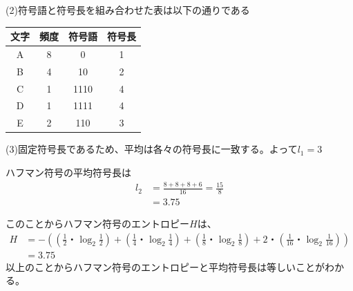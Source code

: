 \documentclass[a4paper,11pt]{ltjsarticle}
\begin{document}
(2)符号語と符号長を組み合わせた表は以下の通りである

\begin{table}[h]
  \centering
  \begin{tabular}{|c|c|c|c|} \hline
  文字 & 頻度 & 符号語 & 符号長 \\ \hline \hline
  A & 8 & 0 & 1 \\ \hline
  B & 4 & 10 & 2 \\ \hline
  C & 1 & 1110 & 4 \\ \hline
  D & 1 & 1111 & 4 \\ \hline
  E & 2 & 110 & 3 \\ \hline
  \end{tabular}
\end{table}

(3)固定符号長であるため、平均は各々の符号長に一致する。よって$l_{1}=3$

ハフマン符号の平均符号長は
\begin{align*}
  l_{2} &= \frac{8+8+8+6}{16} = \frac{15}{8} \\
        &= 3.75
\end{align*}

このことからハフマン符号のエントロピー$H$は、
\begin{align*}
  H &= -((\frac{1}{2}・\log_{2}\frac{1}{2}) + 
  (\frac{1}{4}・\log_{2}\frac{1}{4}) + 
  (\frac{1}{8}・\log_{2}\frac{1}{8}) + 
  2・(\frac{1}{16}・\log_{2}\frac{1}{16})) \\
  &= 3.75
\end{align*}
以上のことからハフマン符号のエントロピーと平均符号長は等しいことがわかる。
\end{document}
